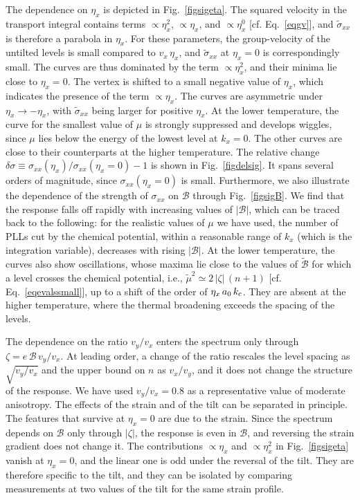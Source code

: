 \documentclass[aps,prb, onecolumn, nofootinbib, citeautoscript,10pt]{revtex4-2}
\newcommand{\red}[1]{{\color{red}#1}}
\begin{document}
\red{The dependence on $\eta_x$ is depicted in Fig.~\ref{figsigeta}. The squared velocity in the transport integral contains terms $\propto\eta_x^2$, $\propto\eta_x$, and $\propto\eta_x^0$ [cf. Eq.~\eqref{eqgv}], and $\tilde\sigma_{xx}$ is therefore a parabola in $\eta_x$. For these parameters, the group-velocity of the untilted levels is small compared to $v_x\,\eta_x$, and $\tilde\sigma_{xx}$ at $\eta_x=0$ is correspondingly small. The curves are thus dominated by the term $\propto\eta_x^2$, and their minima lie close to $\eta_x=0$. The vertex is shifted to a small negative value of $\eta_x$, which indicates the presence of the term $\propto\eta_x$. The curves are asymmetric under $\eta_x\to-\eta_x$, with $\tilde\sigma_{xx}$ being larger for positive $\eta_x$. At the lower temperature, the curve for the smallest value of $\mu$ is strongly suppressed and develops wiggles, since $\mu$ lies below the energy of the lowest level at $k_x=0$. The other curves are close to their counterparts at the higher temperature.}\red{ The relative change $\delta\sigma\equiv\sigma_{xx}(\eta_x)/\sigma_{xx}(\eta_x=0)-1$ is shown in Fig.~\ref{figdelsig}. It spans several orders of magnitude, since $\sigma_{xx}(\eta_x=0)$ is small.}
Furthermore, we also illustrate the dependence of the strength of $ \sigma_{xx}$ on $\mathcal B $ through Fig.~\ref{figsigB}. We find that the response falls off rapidly with increasing values of $|\mathcal B |$, which can be traced back to the following: for the realistic values of $\mu $ we have used, the number of PLLs cut by the chemical potential, within a reasonable range of $k_x$ (which is the integration variable), decreases with rising $|\mathcal B|$.\red{ At the lower temperature, the curves also show oscillations, whose maxima lie close to the values of $\tilde{\mathcal B}$ for which a level crosses the chemical potential, i.e., $\tilde\mu^2\simeq2\,|\zeta|\,(n+1)$ [cf. Eq.~\eqref{eqevalssmall}], up to a shift of the order of $\eta_x\,a_0\,k_{\rm c}$. They are absent at the higher temperature, where the thermal broadening exceeds the spacing of the levels.}


The dependence on the ratio $v_y/v_x$ enters the spectrum only through $\zeta=e\,\mathcal B\,v_y/v_x$. At leading order, a change of the ratio rescales the level spacing as $\sqrt{v_y/v_x}$ and the upper bound on $n$ as $v_x/v_y$, and it does not change the structure of the response. We have used $v_y/v_x=0.8$ as a representative value of moderate anisotropy. The effects of the strain and of the tilt can be separated in principle. \red{The features that survive at $\eta_x=0$ are due to the strain. Since the spectrum depends on $\mathcal B$ only through $|\zeta|$, the response is even in $\mathcal B$, and reversing the strain gradient does not change it.} The contributions $\propto\eta_x$ and $\propto\eta_x^2$ in Fig.~\ref{figsigeta} vanish at $\eta_x=0$, and the linear one is odd under the reversal of the tilt. They are therefore specific to the tilt, and they can be isolated by comparing measurements at two values of the tilt for the same strain profile.
\end{document}
